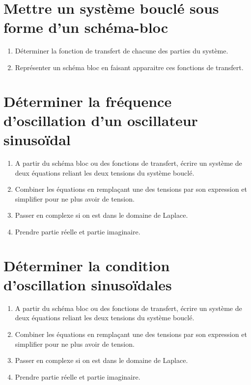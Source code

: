 \section{Mettre un système bouclé sous forme d’un schéma-bloc}
\begin{enumerate}
    \item Déterminer la fonction de transfert de chacune des parties du système.
    \item Représenter un schéma bloc en faisant apparaitre ces fonctions de transfert.
\end{enumerate}

\section{Déterminer la fréquence d’oscillation d’un oscillateur sinusoïdal}
\begin{enumerate}
    \item A partir du schéma bloc ou des fonctions de transfert, écrire un système de deux équations reliant les deux tensions du système bouclé.
    \item Combiner les équations en remplaçant une des tensions par son expression et simplifier pour ne plus avoir de tension.
    \item Passer en complexe si on est dans le domaine de Laplace.
    \item Prendre partie réelle et partie imaginaire.
\end{enumerate}

\section{Déterminer la condition d’oscillation sinusoïdales}
\begin{enumerate}
    \item A partir du schéma bloc ou des fonctions de transfert, écrire un système de deux équations reliant les deux tensions du système bouclé.
    \item Combiner les équations en remplaçant une des tensions par son expression et simplifier pour ne plus avoir de tension.
    \item Passer en complexe si on est dans le domaine de Laplace.
    \item Prendre partie réelle et partie imaginaire.
\end{enumerate}

